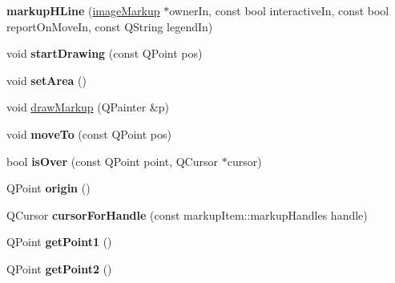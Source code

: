 \begin{DoxyCompactItemize}
\item 
\hypertarget{classmarkupHLine_abc6c17b619b185940f1678b769ab7e1d}{
{\bfseries markupHLine} (\hyperlink{classimageMarkup}{imageMarkup} $\ast$ownerIn, const bool interactiveIn, const bool reportOnMoveIn, const QString legendIn)}
\label{classmarkupHLine_abc6c17b619b185940f1678b769ab7e1d}

\item 
\hypertarget{classmarkupHLine_aafeb04b96ec1c923b3240c29f949d6cb}{
void {\bfseries startDrawing} (const QPoint pos)}
\label{classmarkupHLine_aafeb04b96ec1c923b3240c29f949d6cb}

\item 
\hypertarget{classmarkupHLine_ace494831be4d38937b008cea65adfb05}{
void {\bfseries setArea} ()}
\label{classmarkupHLine_ace494831be4d38937b008cea65adfb05}

\item 
void \hyperlink{classmarkupHLine_a5ed73a79687003d513e037bda5d4e23a}{drawMarkup} (QPainter \&p)
\item 
\hypertarget{classmarkupHLine_acd184832cbdca72e935c0f24dcb9c908}{
void {\bfseries moveTo} (const QPoint pos)}
\label{classmarkupHLine_acd184832cbdca72e935c0f24dcb9c908}

\item 
\hypertarget{classmarkupHLine_a63105859831a3d425d7c1078054903d6}{
bool {\bfseries isOver} (const QPoint point, QCursor $\ast$cursor)}
\label{classmarkupHLine_a63105859831a3d425d7c1078054903d6}

\item 
\hypertarget{classmarkupHLine_adcc990ff459ac11e924a1538af05b3b7}{
QPoint {\bfseries origin} ()}
\label{classmarkupHLine_adcc990ff459ac11e924a1538af05b3b7}

\item 
\hypertarget{classmarkupHLine_a3c4baf641c08d1d0bb47dd9de6120461}{
QCursor {\bfseries cursorForHandle} (const markupItem::markupHandles handle)}
\label{classmarkupHLine_a3c4baf641c08d1d0bb47dd9de6120461}

\item 
\hypertarget{classmarkupHLine_a17647bf1a5fe00cd436cac2d994eea5e}{
QPoint {\bfseries getPoint1} ()}
\label{classmarkupHLine_a17647bf1a5fe00cd436cac2d994eea5e}

\item 
\hypertarget{classmarkupHLine_a762dacc6a99ee751080af0cc1ada7672}{
QPoint {\bfseries getPoint2} ()}
\label{classmarkupHLine_a762dacc6a99ee751080af0cc1ada7672}


\end{DoxyCompactItemize}
